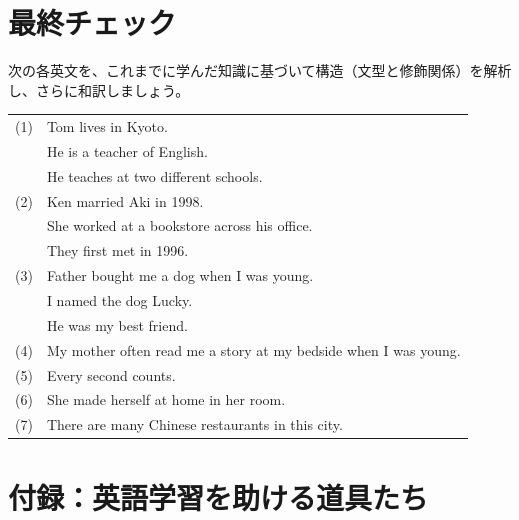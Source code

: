 \documentclass[12pt,titlepage]{jsarticle}
\begin{document}
  \newpage
  \section{最終チェック}
  次の各英文を、これまでに学んだ知識に基づいて構造（文型と修飾関係）を解析し、さらに和訳しましょう。
 \begin{table}[htbp]
    \begin{tabular}{ll}
     (1) & Tom lives in Kyoto. \\
     & He is a teacher of English. \\
     & He teaches at two different schools.\\
     (2) & Ken married Aki in 1998.\\
     & She worked at a bookstore across his office.\\
     & They first met in 1996.\\
     (3) & Father bought me a dog when I was young.\\
     & I named the dog Lucky.\\
     & He was my best friend.\\
     (4) & My mother often read me a story at my bedside when I was young.\\
     (5) & Every second counts.\\
     (6) & She made herself at home in her room.\\
     (7) & There are many Chinese restaurants in this city.\\
    \end{tabular}
 \end{table}


 \section{付録：英語学習を助ける道具たち}
\end{document}
